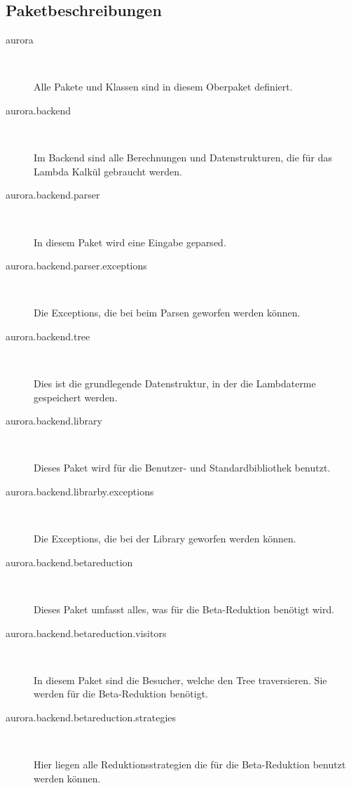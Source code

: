 \documentclass[parskip=full,11pt,twoside]{scrbook}
\begin{document}
\subsection{Paketbeschreibungen}
\begin{description}
	
	
	\item[aurora] ~\par
	Alle Pakete und Klassen sind in diesem Oberpaket definiert.
	
	\item[aurora.backend] ~\par
	Im Backend sind alle Berechnungen und Datenstrukturen, die für das Lambda Kalkül gebraucht werden. 
	
	\item[aurora.backend.parser] ~\par
	In diesem Paket wird eine Eingabe geparsed.

	\item[aurora.backend.parser.exceptions] ~\par
	Die Exceptions, die bei beim Parsen geworfen werden können.

	\item[aurora.backend.tree] ~\par
	Dies ist die grundlegende Datenstruktur, in der die Lambdaterme gespeichert werden.
	
	\item[aurora.backend.library] ~\par
	Dieses Paket wird für die Benutzer- und Standardbibliothek benutzt.
	
	\item[aurora.backend.librarby.exceptions] ~\par
	Die Exceptions, die bei der Library geworfen werden können.
	
	\item[aurora.backend.betareduction] ~\par
	Dieses Paket umfasst alles, was für die Beta-Reduktion benötigt wird.
	
	\item[aurora.backend.betareduction.visitors] ~\par
	In diesem Paket sind die Besucher, welche den Tree traversieren.
    Sie werden für die Beta-Reduktion benötigt.

	\item[aurora.backend.betareduction.strategies] ~\par
	Hier liegen alle Reduktionsstrategien die für die Beta-Reduktion benutzt werden können.


\end{description}
\end{document}
